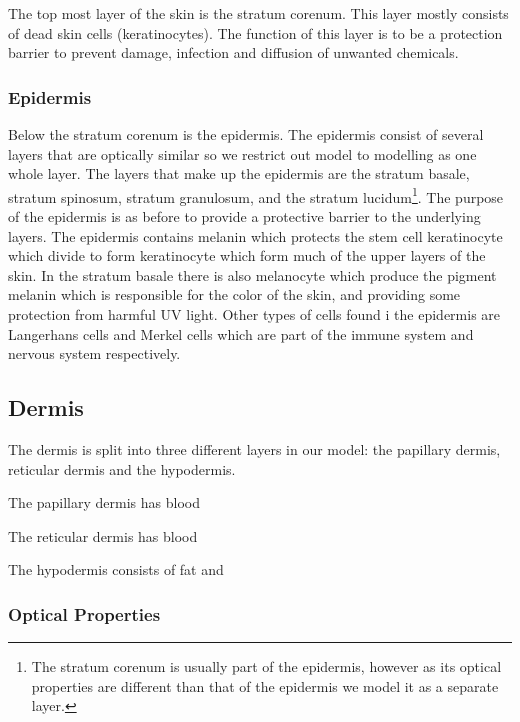 The top most layer of the skin is the stratum corenum.
This layer mostly consists of dead skin cells (keratinocytes).
The function of this layer is to be a protection barrier to prevent damage, infection and diffusion of unwanted chemicals.


\subsubsection*{Epidermis} %
\label{ssub:epidermis}

Below the stratum corenum is the epidermis.
The epidermis consist of several layers that are optically similar so we restrict out model to modelling as one whole layer.
The layers that make up the epidermis are the stratum basale, stratum spinosum, stratum granulosum, and the stratum lucidum\footnote{The stratum corenum is usually part of the epidermis, however as its optical properties are different than that of the epidermis we model it as a separate layer.}.
The purpose of the epidermis is as before to provide a protective barrier to the underlying layers. 
The epidermis contains melanin which protects the stem cell keratinocyte which divide to form keratinocyte which form much of the upper layers of the skin.
In the stratum basale there is also melanocyte which produce the pigment melanin which is responsible for the color of the skin, and providing some protection from harmful UV light. 
Other types of cells found i the epidermis are Langerhans cells and Merkel cells which are part of the immune system and nervous system respectively.


\subsection*{Dermis} %
\label{sub:dermis}

The dermis is split into three different layers in our model: the papillary dermis, reticular dermis and the hypodermis.

The papillary dermis has blood

The reticular dermis has blood

The hypodermis consists of fat and  


\subsubsection*{Optical Properties} %
\label{sub:optical_properties}

